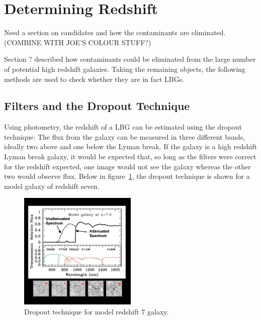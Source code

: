
\section{Determining Redshift} %
\label{sub:determingin_redshift}
	Need a section on candidates and how the contaminants are eliminated.
	(COMBINE WITH JOE’S COLOUR STUFF?)

	Section ? described how contaminants could be eliminated from the large number of potential high redshift galaxies. Taking the remaining objects, the following methods are used to check whether they are in fact LBGs.

	\subsection{Filters and the Dropout Technique} %
		\label{ssub:filters_and_the_dropout_technique}
		Using photometry, the redshift of a LBG can be estimated using the dropout technique: The flux from the galaxy can be measured in three different bands, ideally two above and one below the Lyman break. If the galaxy is a high redshift Lyman break galaxy, it would be expected that, so long as the filters were correct for the redshift expected, one image would not see the galaxy whereas the other two would observe flux. Below in figure~\ref{fig:drop_out_at_z7}, the dropout technique is shown for a model galaxy of redshift seven.
		\begin{figure}[ht]
			\centering
			\includegraphics[width=0.5\textwidth]{../Images/drop_out_at_z7.png}
			\caption{Dropout technique for model redshift 7 galaxy\cite{first_galaxies_dropout_at_z7}.\label{fig:drop_out_at_z7}}
		\end{figure}

